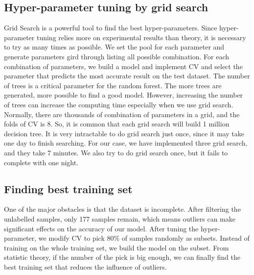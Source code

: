 \documentclass[10pt,conference,compsocconf]{IEEEtran}
\begin{document}
\subsection{Hyper-parameter tuning by grid search}
Grid Search is a powerful tool to find the best hyper-parameters. Since hyper-parameter tuning relies more on experimental results than theory, it is necessary to try as many times as possible. We set the pool for each parameter and generate parameters gird through listing all possible combination. For each combination of parameters, we build a model and implement CV and select the parameter that predicts the most accurate result on the test dataset. The number of trees is a critical parameter for the random forest. The more trees are generated, more possible to find a good model. However, increasing the number of trees can increase the computing time especially when we use grid search. Normally, there are thousands of combination of parameters in a grid, and the folds of CV is 8. So, it is common that each grid search will build 1 million decision tree. It is very intractable to do grid search just once, since it may take one day to finish searching. For our case, we have implemented three grid search, and they take 7 minutes. We also try to do grid search once, but it fails to complete with one night.

\subsection{Finding best training set}
One of the major obstacles is that the dataset is incomplete. After filtering the unlabelled samples, only 177 samples remain, which means outliers can make significant effects on the accuracy of our model. After tuning the hyper-parameter, we modify CV to pick 80\% of samples randomly as subsets. Instead of training on the whole training set, we build the model on the subset. From statistic theory, if the number of the pick is big enough, we can finally find the best training set that reduces the influence of outliers.
\end{document}
